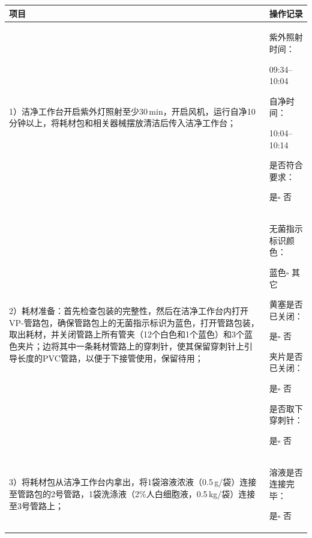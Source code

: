 \documentclass[UTF8,10pt,a4paper,fontset=fandol]{ctexart}
\newcommand{\fieldvalue}[1]{#1}
\newcommand{\handwritten}[1]{#1}
\begin{document}
\begin{tabularx}{\textwidth}{|p{}|X|}
\hline
\centering 项目 & \centering 操作记录 \tabularnewline \hline

1）洁净工作台开启紫外灯照射至少30\,min，开启风机，运行自净10分钟以上，将耗材包和相关器械摆放清洁后传入洁净工作台； &
紫外照射时间：

\fieldvalue{\handwritten{09:34--10:04}}

自净时间：

\fieldvalue{\handwritten{10:04--10:14}}

是否符合要求：

\fbox{\scriptsize\checkmark}\fieldvalue{是}\quad$\square$ 否
\\ \hline

2）耗材准备：首先检查包装的完整性，然后在洁净工作台内打开VP-管路包，确保管路包上的无菌指示标识为蓝色，打开管路包装，取出耗材，并关闭管路上所有管夹（12个白色和1个蓝色）和3个蓝色夹片；边将其中一条耗材管路上的穿刺针，使其保留穿刺针上引导长度的PVC管路，以便于下接管使用，保留待用； &
无菌指示标识颜色：

\fbox{\scriptsize\checkmark}\fieldvalue{蓝色}\quad$\square$ 其它\underline{\hspace{1.2cm}}

黄塞是否已关闭：

\fbox{\scriptsize\checkmark}\fieldvalue{是}\quad$\square$ 否

夹片是否已关闭：

\fbox{\scriptsize\checkmark}\fieldvalue{是}\quad$\square$ 否

是否取下穿刺针：

\fbox{\scriptsize\checkmark}\fieldvalue{是}\quad$\square$ 否
\\ \hline

3）将耗材包从洁净工作台内拿出，将1袋溶液浓液（0.5\,g/袋）连接至管路包的2号管路，1袋洗涤液（2\%人白细胞液，0.5\,kg/袋）连接至3号管路上； &
溶液是否连接完毕：

\fbox{\scriptsize\checkmark}\fieldvalue{是}\quad$\square$ 否
\\ \hline
\end{tabularx}
\end{document}
